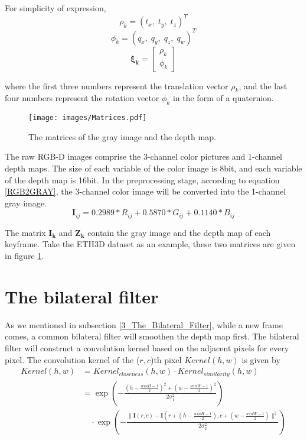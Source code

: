 For simplicity of expression,
\begin{equation}
    \rho_k=(t_x,\; t_y,\; t_z)^T
\end{equation}
\begin{equation}
    \phi_k=(q_x,\; q_y,\; q_z,\; q_w)^T
\end{equation}
\begin{equation}
    \boldsymbol{\xi_k}=\left[\begin{array}{l}
        \rho_k \\
        \phi_k
        \end{array}\right]
\end{equation}

where the first three numbers represent the translation vector $\rho_k$, and the last four numbers represent the rotation vector $\phi_k$ in the form of a quaternion.
\begin{figure}[thb]
    \centering
    \texttt{[image: images/Matrices.pdf]}
    \caption[The matrices of the gray image and the depth map]{The matrices of the gray image and the depth map.}\label{Matrices}
\end{figure}

The raw RGB-D images comprise the 3-channel color pictures and 1-channel depth maps. The size of each variable of the color image is 8bit, and each variable of the depth map is 16bit. In the preprocessing stage, according to equation \ref{RGB2GRAY}, the 3-channel color image will be converted into the 1-channel gray image. 
\begin{equation}
    \boldsymbol{I}_{ij}=0.2989 * R_{ij} + 0.5870 * G_{ij} + 0.1140 * B_{ij}
    \label{RGB2GRAY}
\end{equation}

The matrix $\boldsymbol{I_k}$ and $\boldsymbol{Z_k}$ contain the gray image and the depth map of each keyframe. Take the ETH3D dataset as an example, these two matrices are given in figure \ref{Matrices}.

\section{The bilateral filter}

As we mentioned in subsection \ref{3_The_Bilateral_Filter}, while a new frame comes, a common bilateral filter will smoothen the depth map first. The bilateral filter will construct a convolution kernel based on the adjacent pixels for every pixel. The convolution kernel of the ($r,c$)th pixel $Kernel(h,w)$ is given by
\begin{equation}
    \begin{aligned}
    Kernel(h,w)&=Kernel_{closeness}(h,w)\cdot Kernel_{similarity}(h,w)\\
    &=\exp \left(-\frac{\left(h-\frac{winH-1}{2}\right)^{2}+\left(w-\frac{winW-1}{2}\right)^{2}}{2 \sigma_{1}^{2}}\right)\\
    & \quad \cdot \exp \left(-\frac{\| \boldsymbol{I}(r, c)-\boldsymbol{I}\left(r+\left(h-\frac{winH-1}{2}\right), c+\left(w-\frac{winW-1}{2}\right) \|^{2}\right.}{2 \sigma_{2}^{2}}\right)
    \end{aligned}
    \label{Equ_Bilateral_Filter}
\end{equation}

